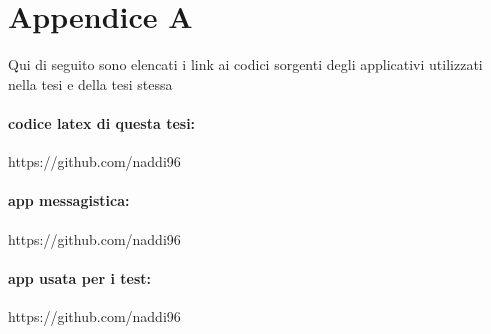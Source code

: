 \chapter*{Appendice A}

Qui di seguito sono elencati i link ai codici sorgenti degli applicativi utilizzati
nella tesi e della tesi stessa

\subsubsection{codice latex di questa tesi:}
https://github.com/naddi96
\subsubsection{app messagistica:}
https://github.com/naddi96
\subsubsection{app usata per i test:}
https://github.com/naddi96